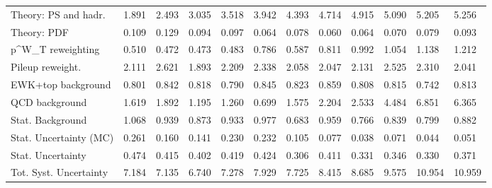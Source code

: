 \begin{tabular}{l|p{0.6cm}p{0.6cm}p{0.6cm}p{0.6cm}p{0.6cm}p{0.6cm}p{0.6cm}p{0.6cm}p{0.6cm}p{0.6cm}p{0.6cm}}
Theory: PS and hadr.                     & 1.891 & 2.493 & 3.035 & 3.518 & 3.942 & 4.393 & 4.714 & 4.915 & 5.090 & 5.205 & 5.256 \\
Theory: PDF                              & 0.109 & 0.129 & 0.094 & 0.097 & 0.064 & 0.078 & 0.060 & 0.064 & 0.070 & 0.079 & 0.093 \\
p^{W}_{T} reweighting                    & 0.510 & 0.472 & 0.473 & 0.483 & 0.786 & 0.587 & 0.811 & 0.992 & 1.054 & 1.138 & 1.212 \\
Pileup reweight.                         & 2.111 & 2.621 & 1.893 & 2.209 & 2.338 & 2.058 & 2.047 & 2.131 & 2.525 & 2.310 & 2.041 \\
EWK+top background                       & 0.801 & 0.842 & 0.818 & 0.790 & 0.845 & 0.823 & 0.859 & 0.808 & 0.815 & 0.742 & 0.813 \\
QCD background                           & 1.619 & 1.892 & 1.195 & 1.260 & 0.699 & 1.575 & 2.204 & 2.533 & 4.484 & 6.851 & 6.365 \\
Stat. Background                         & 1.068 & 0.939 & 0.873 & 0.933 & 0.977 & 0.683 & 0.959 & 0.766 & 0.839 & 0.799 & 0.882 \\
Stat. Uncertainty (MC)                   & 0.261 & 0.160 & 0.141 & 0.230 & 0.232 & 0.105 & 0.077 & 0.038 & 0.071 & 0.044 & 0.051 \\
\hline
Stat. Uncertainty                        & 0.474 & 0.415 & 0.402 & 0.419 & 0.424 & 0.306 & 0.411 & 0.331 & 0.346 & 0.330 & 0.371 \\
\hline
Tot. Syst. Uncertainty                   & 7.184 & 7.135 & 6.740 & 7.278 & 7.929 & 7.725 & 8.415 & 8.685 & 9.575 & 10.954 & 10.959 \\
\hline
\end{tabular}
